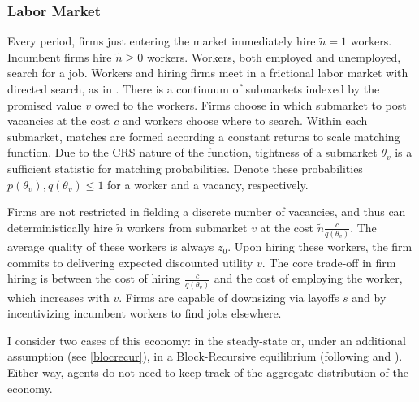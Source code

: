 \subsubsection*{Labor Market}  %
Every period, firms just entering the market immediately hire $\tilde{n}=1$ workers. Incumbent firms hire $\tilde{n}\geq 0$ workers. Workers, both employed and unemployed, search for a job. Workers and hiring firms meet in a frictional labor market with directed search, as in \textcite{moen1997}. There is a continuum of submarkets indexed by the promised value $v$ owed to the workers. Firms choose in which submarket to post vacancies at the cost $c$ and workers choose where to search. Within each submarket, matches are formed according a constant returns to scale matching function. Due to the CRS nature of the function, tightness of a submarket $\theta_v$ is a sufficient statistic for matching probabilities. Denote these probabilities $p(\theta_v),q(\theta_v)\leq 1$ for a worker and a vacancy, respectively. 

Firms are not restricted in fielding a discrete number of vacancies, and thus can deterministically hire $\tilde{n}$ workers from submarket $v$ at the cost $\tilde{n}\frac{c}{q(\theta_v)}$. The average quality of these workers is always $z_0$. Upon hiring these workers, the firm commits to delivering expected discounted utility $v$. The core trade-off in firm hiring is between the cost of hiring $\frac{c}{q(\theta_v)}$ and the cost of employing the worker, which increases with $v$.
Firms are capable of downsizing via layoffs $s$ and by incentivizing incumbent workers to find jobs elsewhere. 

I consider two cases of this economy: in the steady-state or, under an additional assumption (see \ref{blocrecur}), in a Block-Recursive equilibrium (following \textcite{menzio2011} and \textcite{schaal2017}). Either way, agents do not need to keep track of the aggregate distribution of the economy.
